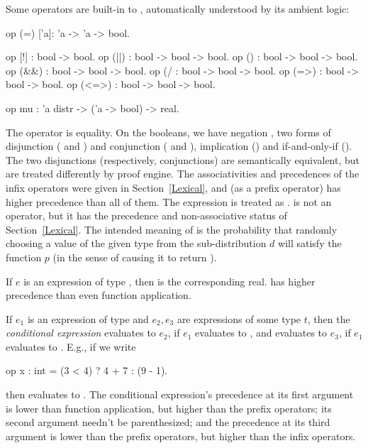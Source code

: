Some operators are built-in to \EasyCrypt, automatically understood
by its ambient logic:
\begin{easycrypt}{}{}
op (=) ['a]: 'a -> 'a -> bool.

op [!] : bool -> bool.
op (||) : bool -> bool -> bool.
op (\/) : bool -> bool -> bool.
op (&&) : bool -> bool -> bool.
op (/\) : bool -> bool -> bool.
op (=>) : bool -> bool -> bool.
op (<=>) : bool -> bool -> bool.

op mu : 'a distr -> ('a -> bool) -> real.
\end{easycrypt}
The operator \ec{=} is equality. On the booleans, we have negation
\ec{!}, two forms of disjunction (\ec{\\/} and \ec{||}) and conjunction
(\ec{/\\} and \ec{&&}), implication (\ec{=>}) and if-and-only-if
(\ec{<=>}).  The two disjunctions (respectively, conjunctions) are
semantically equivalent, but are treated differently by \EasyCrypt
proof engine. The associativities and precedences of the infix
operators were given in Section~\ref{Lexical}, and (as a prefix
operator) \ec{!} has higher precedence than all of them. The
expression  is treated as . \ec{<>} is not an operator, but it has the precedence and
non-associative status of Section~\ref{Lexical}.
The intended meaning of  is the probability that
randomly choosing a value of the given type from the sub-distribution
$d$ will satisfy the function $p$ (in the sense of causing it to return
).

If $e$ is an expression of type , then
 is the corresponding real.  has higher precedence
than even function application.

If $e_1$ is an expression of type  and $e_2,e_3$ are expressions
of some type $t$, then the \emph{conditional expression}
 evaluates to $e_2$, if $e_1$ evaluates to
, and evaluates to $e_3$, if $e_1$ evaluates to .
E.g., if we write
\begin{easycrypt}{}{}
op x : int = (3 < 4) ? 4 + 7 : (9 - 1).
\end{easycrypt}
then  evaluates to . The conditional expression's
precedence at its first argument is lower than function
application, but higher than the prefix operators; its second argument
needn't be parenthesized; and the precedence at its third argument is
lower than the prefix operators, but higher than the infix operators.


